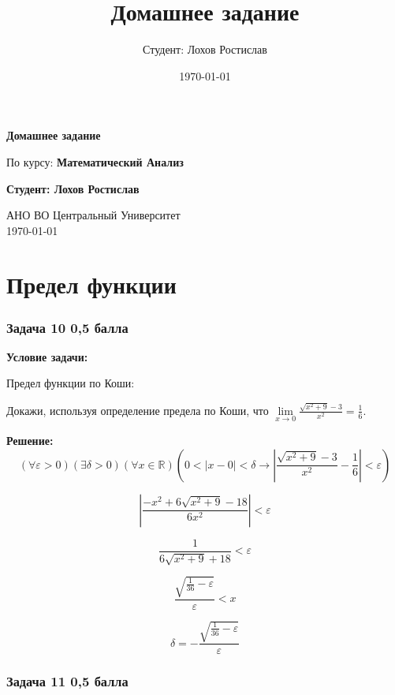 \documentclass[a4paper,12pt]{article}
\title{Домашнее задание}
\author{Студент: Лохов Ростислав}
\date{\today}
\begin{document}
\begin{titlepage}
    \centering
    \vspace*{1cm}

    \Huge
    \textbf{Домашнее задание}

    \vspace{0.5cm}
    \LARGE
    По курсу: \textbf{Математический Анализ}

    \vspace{1.5cm}

    \textbf{Студент: Лохов Ростислав}

    \vfill

    \Large
    АНО ВО Центральный Университет\\
    \vspace{0.3cm}
    \today

\end{titlepage}

\tableofcontents
\newpage

\section{Предел функции}

\subsubsection{Задача 10 \hfill 0,5 балла}

\textbf{Условие задачи:}

Предел функции по Коши:

Докажи, используя определение предела по Коши, что $\lim\limits_{x \to 0} \frac{\sqrt{x^2 + 9} - 3}{x^2} = \frac{1}{6}$.

\textbf{Решение: }
\[
(\forall \varepsilon > 0)(\exists \delta > 0) (\forall x \in \mathbb{R}) (0 < |x-0|< \delta \longrightarrow |\frac{\sqrt{x^2 + 9} - 3}{x^2} - \frac{1}{6}| < \varepsilon)
\]

\[
|\frac{-x^2+6\sqrt{x^2+9}-18}{6x^2}| < \varepsilon
\]

\[
\frac{1}{6\sqrt{x^2+9}+18} < \varepsilon
\]

\[
\frac{\sqrt{\frac{1}{36}-\varepsilon}}{\varepsilon} < x
\]

\[
\delta = -\frac{\sqrt{\frac{1}{36}-\varepsilon}}{\varepsilon}
\]

\vspace{1cm}

\subsubsection{Задача 11 \hfill 0,5 балла}
\end{document}

